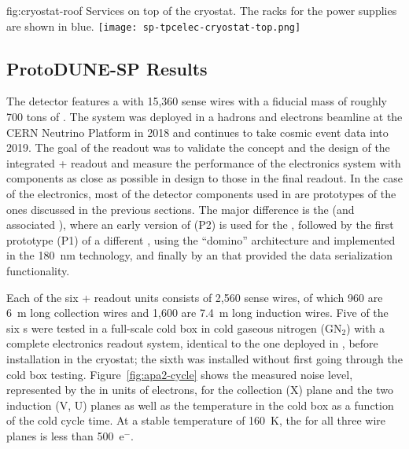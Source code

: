 \begin{dunefigure}
{fig:cryostat-roof}
{Services on top of the cryostat. The racks for the  power supplies are shown in blue.}
\texttt{[image: sp-tpcelec-cryostat-top.png]}
\end{dunefigure}

\subsection{ProtoDUNE-SP Results}
\label{sec:fdsp-tpcelec-overview-pdune}

The  detector features a  with 15,360 sense wires
with a fiducial mass of roughly \num{700} tons of \lar. 
The system was deployed in a hadrons and electrons beamline at the CERN Neutrino Platform 
in 2018 and continues to take cosmic event data into 2019. The goal of 
the   readout was to validate the concept 
and the design of the integrated + readout 
and measure the performance of the  electronics system with components 
as close as possible in design to those in the final   readout.
In the case of the  electronics, most of the detector components 
used in  are prototypes of the   ones discussed in the 
previous sections. The major difference is the  (and associated
), where an
early version of  (P2) is used for the  , followed
by the first prototype (P1) of a different , using the ``domino'' architecture 
and implemented in the \SI{180}{nm} technology, and finally by
an  that provided the data serialization functionality.

Each of the six  +
readout units consists of 2,560 sense wires, of which 960 are \SI{6}{m} 
long collection wires and 1,600 are \SI{7.4}{m} long induction wires. 
Five of the six s were tested in a full-scale cold box in 
cold gaseous nitrogen (GN$_2$) with a complete  electronics readout system,  
identical to the one %
deployed in , before installation in the cryostat;
the sixth was installed without first going through the cold
box testing. Figure~\ref{fig:apa2-cycle} shows the measured noise level, 
represented by the  in units of 
electrons, for the collection (X) plane and the two induction (V, U) 
planes as well as the  temperature in the cold box as a 
function of the cold cycle time. At a stable temperature of 
\SI{160}{K}, the  for all three wire planes is less than 500~e$^-$.

